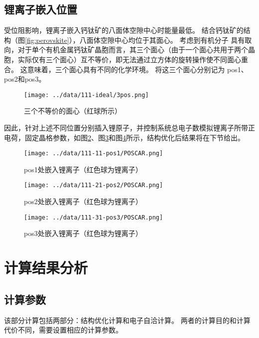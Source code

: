 \subsection{锂离子嵌入位置}

受位阻影响，锂离子嵌入钙钛矿的八面体空隙中心时能量最低。
结合钙钛矿的结构（图\ref{fig:perovskite}），八面体空隙中心均位于其面心。
考虑到有机分子  具有取向，对于单个有机金属钙钛矿晶胞而言，其三个面心（由于一个面心共用于两个晶胞，实际仅有三个面心）互不等价，即无法通过立方体的旋转操作使不同面心重合。
这意味着，三个面心具有不同的化学环境。
将这三个面心分别记为 pos1、pos2和pos3。

\begin{figure}[ht]
    \centering
    \texttt{[image: ../data/111-ideal/3pos.png]}
    \caption{三个不等价的面心（红球所示）}
    \label{fig:3pos}
\end{figure}


因此，针对上述不同位置分别插入锂原子，并控制系统总电子数模拟锂离子所带正电荷，固定晶格参数，如图\ref{fig:pos1-poscar}、图\ref{fig:pos2-poscar}和图\ref{fig:pos3-poscar}所示，结构优化后结果将在下节给出。

\begin{figure}[ht]
    \centering
    \texttt{[image: ../data/111-11-pos1/POSCAR.png]}
    \caption{pos1处嵌入锂离子（红色球为锂离子）}
    \label{fig:pos1-poscar}
\end{figure}
\begin{figure}[ht]
    \centering
    \texttt{[image: ../data/111-21-pos2/POSCAR.png]}
    \caption{pos2处嵌入锂离子（红色球为锂离子）}
    \label{fig:pos2-poscar}
\end{figure}
\begin{figure}[ht]
    \centering
    \texttt{[image: ../data/111-31-pos3/POSCAR.png]}
    \caption{pos3处嵌入锂离子（红色球为锂离子）}
    \label{fig:pos3-poscar}
\end{figure}



\section{计算结果分析}

\subsection{计算参数}

该部分计算包括两部分：结构优化计算和电子自洽计算。
两者的计算目的和计算代价不同，需要设置相应的计算参数。

